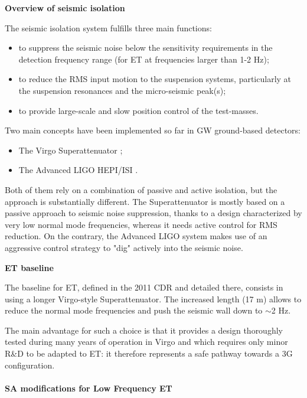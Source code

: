 \label{sec:seismic}


{\bf Overview of seismic isolation}

The seismic isolation system fulfills three main functions:
\begin{itemize}
    \item to suppress the seismic noise below the sensitivity requirements in the detection frequency range (for ET at frequencies larger than 1-2 Hz);
    \item to reduce the RMS input motion to the suspension systems, particularly at the suspension resonances and the micro-seismic peak(s);
    \item to provide large-scale and slow position control of the test-masses.
\end{itemize}

Two main concepts have been implemented so far in GW ground-based detectors:
\begin{itemize}
    \item The Virgo Superattenuator \cite{};
    \item The Advanced LIGO HEPI/ISI \cite{}.
\end{itemize}

Both of them rely on a combination of passive and active isolation, but the approach is substantially different. The Superattenuator is mostly based on a passive approach to seismic noise suppression, thanks to a design characterized by very low normal mode frequencies, whereas it needs active control for RMS reduction. On the contrary, the Advanced LIGO system makes use of an aggressive control strategy to "dig" actively into the seismic noise.


{\bf ET baseline}

The baseline for ET, defined in the 2011 CDR and detailed there, consists in using a longer Virgo-style Superattenuator. The increased length (17 m) allows to reduce the normal mode frequencies and push the seismic wall down to $\sim$2 Hz. 

The main advantage for such a choice is that it provides a design thoroughly tested during many years of operation in Virgo and which requires only minor R\&D to be adapted to ET: it therefore represents a safe pathway towards a 3G configuration. 

\paragraph{SA modifications for Low Frequency ET}

